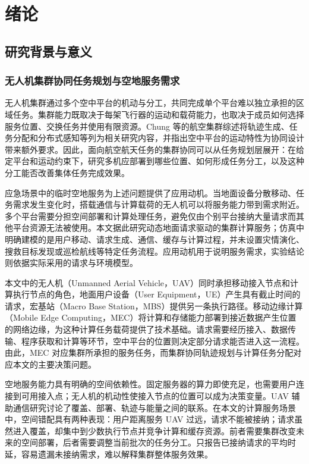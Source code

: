 \chapter{绪论}
\label{cha:introduction}

\section{研究背景与意义}
\label{sec:background}

\subsection{无人机集群协同任务规划与空地服务需求}
\label{sec:ch1-edge-background}

无人机集群通过多个空中平台的机动与分工，共同完成单个平台难以独立承担的区域任务。集群能力既取决于每架飞行器的运动和载荷能力，也取决于成员如何选择服务位置、交换任务并使用有限资源。Chung 等的航空集群综述将轨迹生成、任务分配和分布式感知等列为相关研究内容，并指出空中平台的运动特性为协同设计带来额外要求\cite{chung2018swarm}。因此，面向航空航天任务的集群协同可以从任务规划层展开：在给定平台和运动约束下，研究多机应部署到哪些位置、如何形成任务分工，以及这种分工能否改善集体任务完成效果。

应急场景中的临时空地服务为上述问题提供了应用动机。当地面设备分散移动、任务需求发生变化时，搭载通信与计算载荷的无人机可以将服务能力带到需求附近。多个平台需要分担空间部署和计算处理任务，避免仅由个别平台接纳大量请求而其他平台资源无法被使用。本文据此研究动态地面请求驱动的集群计算服务；仿真中明确建模的是用户移动、请求生成、通信、缓存与计算过程，并未设置灾情演化、搜救目标发现或巡检航线等特定任务流程。应用动机用于说明服务需求，实验结论则依据实际采用的请求与环境模型。

本文中的无人机（Unmanned Aerial Vehicle，UAV）同时承担移动接入节点和计算执行节点的角色，地面用户设备（User Equipment，UE）产生具有截止时间的请求，宏基站（Macro Base Station，MBS）提供另一条执行路径。移动边缘计算（Mobile Edge Computing，MEC）将计算和存储能力部署到接近数据产生位置的网络边缘，为这种计算任务载荷提供了技术基础\cite{mao2017survey}。请求需要经历接入、数据传输、程序获取和计算等环节，空中平台的位置则决定部分请求能否进入这一流程。由此，MEC 对应集群所承担的服务任务，而集群协同轨迹规划与计算任务分配对应本文的主要决策问题。

空地服务能力具有明确的空间依赖性。固定服务器的算力即使充足，也需要用户连接到可用接入点；无人机的机动性使接入节点的位置可以成为决策变量。UAV 辅助通信研究讨论了覆盖、部署、轨迹与能量之间的联系\cite{zeng2016wireless,mozaffari2019tutorial}。在本文的计算服务场景中，空间错配具有两种表现：用户距离服务 UAV 过远，请求不能被接纳；请求虽然进入覆盖，却集中到少数执行节点并竞争计算和缓存资源。前者需要集群改变未来的空间部署，后者需要调整当前批次的任务分工。只报告已接纳请求的平均时延，容易遗漏未接纳需求，难以解释集群整体服务效果。

